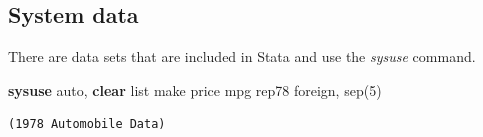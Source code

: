 \documentclass[
]{book}
\newenvironment{Shaded}{\begin{snugshade}}{\end{snugshade}}
\newcommand{\KeywordTok}[1]{\textcolor[rgb]{0.13,0.29,0.53}{\textbf{#1}}}
\newcommand{\NormalTok}[1]{#1}
\newcommand{\OtherTok}[1]{\textcolor[rgb]{0.56,0.35,0.01}{#1}}
\begin{document}
\subsection{System data}\label{system-data}

There are data sets that are included in Stata and use the \emph{sysuse} command.

\begin{Shaded}
\begin{Highlighting}[]
\KeywordTok{sysuse}\NormalTok{ auto, }\KeywordTok{clear}
\OtherTok{list}\NormalTok{ make price mpg rep78 foreign, sep(5)}
\end{Highlighting}
\end{Shaded}

\begin{verbatim}
(1978 Automobile Data)


\end{verbatim}
\end{document}
